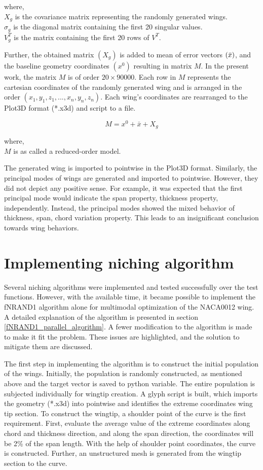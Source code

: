 where,\\
$X_g$ is the covariance matrix representing the randomly generated wings.\\
$\sigma_g$ is the diagonal matrix containing the first 20 singular values.\\
$V^T_g$ is the matrix containing the first 20 rows of $V^T$.

Further, the obtained matrix $(X_g)$ is added to mean of error vectors $(\Bar{x})$, and the baseline geometry coordinates $(x^0)$ resulting in matrix $M$. In the present work, the matrix $M$ is of order $20 \times 90000$. Each row in $M$ represents the cartesian coordinates of the randomly generated wing and is arranged in the order $(x_1, y_1, z_1, ..., x_n, y_n, z_n)$. Each wing's coordinates are rearranged to the Plot3D format (*.x3d) and script to a file.

$$ M = x^0 + \bar{x} + X_g $$

where,\\
$M$ is as called a reduced-order model.

The generated wing is imported to pointwise in the Plot3D format. Similarly, the principal modes of wings are generated and imported to pointwise. However, they did not depict any positive sense. For example, it was expected that the first principal mode would indicate the span property, thickness property, independently. Instead, the principal modes showed the mixed behavior of thickness, span, chord variation property. This leads to an insignificant conclusion towards wing behaviors.

\section{Implementing niching algorithm}
Several niching algorithms were implemented and tested successfully over the test functions. However, with the available time, it became possible to implement the fNRAND1 algorithm alone for multimodal optimization of the NACA0012 wing. A detailed explanation of the algorithm is presented in section \ref{fNRAND1_parallel_algorithm}. A fewer modification to the algorithm is made to make it fit the problem. These issues are highlighted, and the solution to mitigate them are discussed.  

The first step in implementing the algorithm is to construct the initial population of the wings. Initially, the population is randomly constructed, as mentioned above and the target vector is saved to python variable. The entire population is subjected individually for wingtip creation. A glyph script is built, which imports the geometry (*.x3d) into pointwise and identifies the extreme coordinates wing tip section. To construct the wingtip, a shoulder point of the curve is the first requirement. First, evaluate the average value of the extreme coordinates along chord and thickness direction, and along the span direction, the coordinates will be 2\% of the span length. With the help of shoulder point coordinates, the curve is constructed. Further, an unstructured mesh is generated from the wingtip section to the curve.

